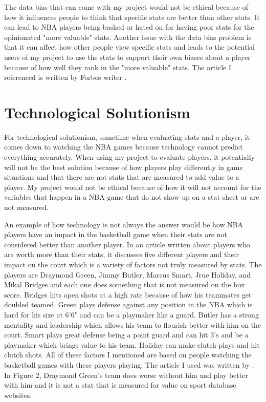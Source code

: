 \documentclass[10pt,twocolumn]{article}
\begin{document}
The data bias that can come with my project would not be ethical because of how it influences people to think that specific stats are better than other stats. It can lead to NBA players being bashed or hated on for having poor stats for the opinionated "more valuable" stats. Another issue with the data bias problem is that it can affect how other people view specific stats and leads to the potential users of my project to use the stats to support their own biases about a player because of how well they rank in the "more valuable" stats. The article I referenced is written by Forbes writer \textcite{MVPJokic}.

\section{Technological Solutionism}

For technological solutionism, sometime when evaluating stats and a player, it comes down to watching the NBA games because technology cannot predict everything accurately. When using my project to evaluate players, it potentially will not be the best solution because of how players play differently in game situations and that there are not stats that are measured to add value to a player. My project would not be ethical because of how it will not account for the variables that happen in a NBA game that do not show up on a stat sheet or are not measured. 

An example of how technology is not always the answer would be how NBA players have an impact in the basketball game when their stats are not considered better than another player. In an article written about players who are worth more than their stats, it discusses five different players and their impact on the court which is a variety of factors not truly measured by stats. The players are Draymond Green, Jimmy Butler, Marcus Smart, Jrue Holiday, and Mikal Bridges and each one does something that is not measured on the box score. Bridges hits open shots at a high rate because of how his teammates get doubled teamed. Green plays defense against any position in the NBA which is hard for his size at 6'6" and can be a playmaker like a guard. Butler has a strong mentality and leadership which allows his team to flourish better with him on the court. Smart plays great defense being a point guard and can hit 3's and be a playmaker which brings value to his team. Holiday can make clutch plays and hit clutch shots. All of these factors I mentioned are based on people watching the basketball games with these players playing. The article I used was written by \textcite{NoStatSheet}. In Figure 2, Draymond Green's team does worse without him and play better with him and it is not a stat that is measured for value on sport database websites.
\end{document}
